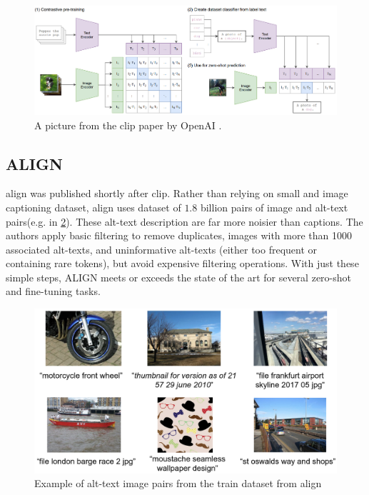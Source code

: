         \begin{figure}
            \centering
            \includegraphics[width=\textwidth]{Images/crossmodalnetworks/OpenAICLIP.png}
            \caption{A picture from the \acrshort{clip} paper by OpenAI \cite{clip}.}
            \label{fig:crossmodalnetworks:openaiclip}
        \end{figure}

        \subsection{ALIGN
            \label{section:align}}
        \acrfull{align}\cite{ALIGN} was published shortly after \acrshort{clip}.
        Rather than relying on small and image captioning dataset, \acrshort{align} uses dataset of \(1.8\) billion pairs of image and alt-text pairs(e.g. in \cref{fig:crossmodalnetworks:alignepairs}).
        These alt-text description are far more noisier than captions.
        The authors apply basic filtering to remove duplicates, images with more than 1000 associated alt-texts, and uninformative alt-texts (either too frequent or containing rare tokens), but avoid expensive filtering operations.
        With just these simple steps, ALIGN meets or exceeds the state of the art for several zero-shot and fine-tuning tasks.
        \begin{figure}
            \centering
            \includegraphics[width=\textwidth]{Images/crossmodalnetworks/examplepicsalign.png}
            \caption{Example of alt-text image pairs from the train dataset from \acrshort{align}}
            \label{fig:crossmodalnetworks:alignepairs}
        \end{figure}

